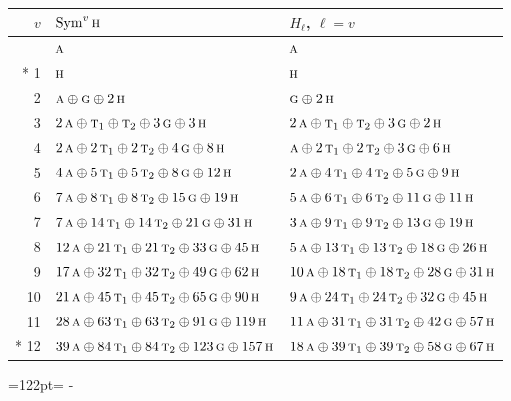 \documentclass[10pt,a4paper]{article}
\newcommand{\needspace}[1]{\par\penalty-100\begingroup\dimen0=#1\relax\dimen2=\pagegoal
  \advance\dimen2-\pagetotal\ifdim\dimen0>\dimen2\relax\ifdim\dimen2>0pt\vfil\break\fi\fi
  \endgroup}
\numberwithin{equation}{section}
\newcommand{\irr}[1]{\text{\normalfont\scshape #1}}
\begin{document}
{\small\begin{longtable}{@{}rll@{}}\toprule
$v$ & $\operatorname{Sym}^{v}\irr{h}$ & $H_\ell$, $\ell = v$\\\midrule\endhead
\bottomrule\endfoot\endlastfoot
0 & $\irr{a}$ & $\irr{a}$\\*
1 & $\irr{h}$ & $\irr{h}$\\
2 & $\irr{a} \oplus \irr{g} \oplus 2\,\irr{h}$ & $\irr{g} \oplus 2\,\irr{h}$\\
3 & $2\,\irr{a} \oplus \irr{t}_{1} \oplus \irr{t}_{2} \oplus 3\,\irr{g} \oplus 3\,\irr{h}$ & $2\,\irr{a} \oplus \irr{t}_{1} \oplus \irr{t}_{2} \oplus 3\,\irr{g} \oplus 2\,\irr{h}$\\
4 & $2\,\irr{a} \oplus 2\,\irr{t}_{1} \oplus 2\,\irr{t}_{2} \oplus 4\,\irr{g} \oplus 8\,\irr{h}$ & $\irr{a} \oplus 2\,\irr{t}_{1} \oplus 2\,\irr{t}_{2} \oplus 3\,\irr{g} \oplus 6\,\irr{h}$\\
5 & $4\,\irr{a} \oplus 5\,\irr{t}_{1} \oplus 5\,\irr{t}_{2} \oplus 8\,\irr{g} \oplus 12\,\irr{h}$ & $2\,\irr{a} \oplus 4\,\irr{t}_{1} \oplus 4\,\irr{t}_{2} \oplus 5\,\irr{g} \oplus 9\,\irr{h}$\\
6 & $7\,\irr{a} \oplus 8\,\irr{t}_{1} \oplus 8\,\irr{t}_{2} \oplus 15\,\irr{g} \oplus 19\,\irr{h}$ & $5\,\irr{a} \oplus 6\,\irr{t}_{1} \oplus 6\,\irr{t}_{2} \oplus 11\,\irr{g} \oplus 11\,\irr{h}$\\
7 & $7\,\irr{a} \oplus 14\,\irr{t}_{1} \oplus 14\,\irr{t}_{2} \oplus 21\,\irr{g} \oplus 31\,\irr{h}$ & $3\,\irr{a} \oplus 9\,\irr{t}_{1} \oplus 9\,\irr{t}_{2} \oplus 13\,\irr{g} \oplus 19\,\irr{h}$\\
8 & $12\,\irr{a} \oplus 21\,\irr{t}_{1} \oplus 21\,\irr{t}_{2} \oplus 33\,\irr{g} \oplus 45\,\irr{h}$ & $5\,\irr{a} \oplus 13\,\irr{t}_{1} \oplus 13\,\irr{t}_{2} \oplus 18\,\irr{g} \oplus 26\,\irr{h}$\\
9 & $17\,\irr{a} \oplus 32\,\irr{t}_{1} \oplus 32\,\irr{t}_{2} \oplus 49\,\irr{g} \oplus 62\,\irr{h}$ & $10\,\irr{a} \oplus 18\,\irr{t}_{1} \oplus 18\,\irr{t}_{2} \oplus 28\,\irr{g} \oplus 31\,\irr{h}$\\
10 & $21\,\irr{a} \oplus 45\,\irr{t}_{1} \oplus 45\,\irr{t}_{2} \oplus 65\,\irr{g} \oplus 90\,\irr{h}$ & $9\,\irr{a} \oplus 24\,\irr{t}_{1} \oplus 24\,\irr{t}_{2} \oplus 32\,\irr{g} \oplus 45\,\irr{h}$\\
11 & $28\,\irr{a} \oplus 63\,\irr{t}_{1} \oplus 63\,\irr{t}_{2} \oplus 91\,\irr{g} \oplus 119\,\irr{h}$ & $11\,\irr{a} \oplus 31\,\irr{t}_{1} \oplus 31\,\irr{t}_{2} \oplus 42\,\irr{g} \oplus 57\,\irr{h}$\\*
12 & $39\,\irr{a} \oplus 84\,\irr{t}_{1} \oplus 84\,\irr{t}_{2} \oplus 123\,\irr{g} \oplus 157\,\irr{h}$ & $18\,\irr{a} \oplus 39\,\irr{t}_{1} \oplus 39\,\irr{t}_{2} \oplus 58\,\irr{g} \oplus 67\,\irr{h}$\\
\bottomrule\end{longtable}}
\needspace{122pt}
\end{document}
